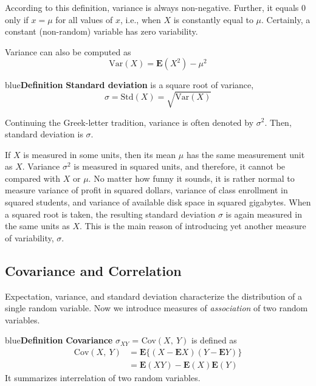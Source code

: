 \documentclass{article}
\newenvironment{definition}[1]{\begin{mybox}{blue}{\textbf{Definition #1}}}{\end{mybox}}
\begin{document}
According to this definition, variance is always non-negative. Further, it equals 0 only if $x = \mu$ for all values of $x$, i.e., when $X$ is constantly equal to $\mu$. Certainly, a constant (non-random) variable has zero variability. 

\noindent Variance can also be computed as
\begin{equation*}
    \text{Var}(X) = \mathbf{E}(X^2) - \mu^2
\end{equation*}
\begin{definition}{}
\textbf{Standard deviation} is a square root of variance,
\begin{equation*}
    \sigma = \text{Std}(X) = \sqrt{\text{Var}(X)}
\end{equation*}
\end{definition}
\noindent Continuing the Greek-letter tradition, variance is often denoted by $\sigma^2$. Then, standard deviation is $\sigma$.

If $X$ is measured in some units, then its mean $\mu$ has the same measurement unit as $X$. Variance $\sigma^2$ is measured in squared units, and therefore, it cannot be compared with $X$ or $\mu$. No matter how funny it sounds, it is rather normal to measure variance of profit in squared dollars, variance of class enrollment in squared students, and variance of available disk space in squared gigabytes. When a squared root is taken, the resulting standard deviation $\sigma$ is again measured in the same units as $X$. This is the main reason of introducing yet another measure of variability, $\sigma$.

\subsection{Covariance and Correlation}

Expectation, variance, and standard deviation characterize the distribution of a single random variable. Now we introduce measures of \textit{association} of two random variables.

\begin{definition}{}
\textbf{Covariance} $\sigma_{XY}$ = Cov$(X,\ Y)$ is defined as
\begin{align*}
    \text{Cov}(X,\ Y) &= \mathbf{E}\{(X - \mathbf{E}X) (Y - \mathbf{E}Y)\}\\
    &= \mathbf{E}(XY) - \mathbf{E}(X)\mathbf{E}(Y)
\end{align*}
It summarizes interrelation of two random variables.
\end{definition}
\end{document}
